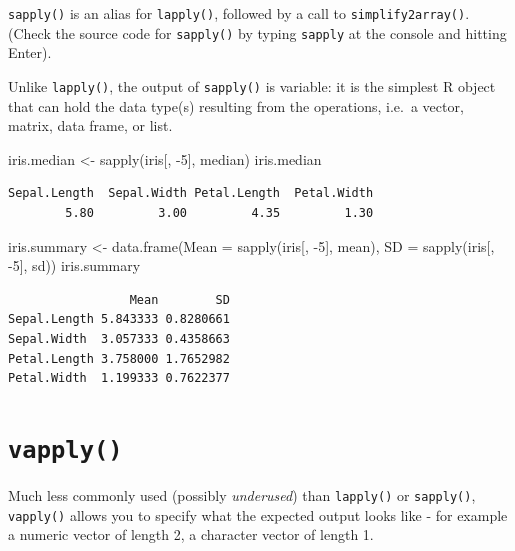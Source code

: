 \documentclass[
]{book}
\makeatletter
\newenvironment{Shaded}{\begin{snugshade}}{\end{snugshade}}
\newcommand{\AttributeTok}[1]{\textcolor[rgb]{0.77,0.63,0.00}{#1}}
\newcommand{\DecValTok}[1]{\textcolor[rgb]{0.00,0.00,0.81}{#1}}
\newcommand{\FunctionTok}[1]{\textcolor[rgb]{0.00,0.00,0.00}{#1}}
\newcommand{\NormalTok}[1]{#1}
\newcommand{\OtherTok}[1]{\textcolor[rgb]{0.56,0.35,0.01}{#1}}
\newcommand{\SpecialCharTok}[1]{\textcolor[rgb]{0.00,0.00,0.00}{#1}}
\newenvironment{kframe}{%
\medskip{}
\setlength{\fboxsep}{.8em}
 \def\at@end@of@kframe{}%
 \ifinner\ifhmode%
  \def\at@end@of@kframe{\end{minipage}}%
  \begin{minipage}{\columnwidth}%
 \fi\fi%
 \def\FrameCommand##1{\hskip\@totalleftmargin \hskip-\fboxsep
 \colorbox{shadecolor}{##1}\hskip-\fboxsep
     \hskip-\linewidth \hskip-\@totalleftmargin \hskip\columnwidth}%
 \MakeFramed {\advance\hsize-\width
   \@totalleftmargin\z@ \linewidth\hsize
   \@setminipage}}%
 {\par\unskip\endMakeFramed%
 \at@end@of@kframe}
\newenvironment{rmdblock}[1]
  {
  \begin{itemize}
  \renewcommand{\labelitemi}{
    \raisebox{-.7\height}[0pt][0pt]{
      {\setkeys{Gin}{width=3em,keepaspectratio}\texttt{[image: images/\#1]}}
    }
  }
  \setlength{\fboxsep}{1em}
  \begin{kframe}
  \item
  }
  {
  \end{kframe}
  \end{itemize}
  }
\newenvironment{note}
  {\begin{rmdblock}{note}}
  {\end{rmdblock}}
\makeatother
\begin{document}
\texttt{sapply()} is an alias for \texttt{lapply()}, followed by a call to \texttt{simplify2array()}.\\
(Check the source code for \texttt{sapply()} by typing \texttt{sapply} at the console and hitting Enter).

\begin{note}
Unlike \texttt{lapply()}, the output of \texttt{sapply()} is variable:
it is the simplest R object that can hold the data type(s) resulting
from the operations, i.e.~a vector, matrix, data frame, or list.
\end{note}

\begin{Shaded}
\begin{Highlighting}[]
\NormalTok{iris.median }\OtherTok{\textless{}{-}} \FunctionTok{sapply}\NormalTok{(iris[, }\SpecialCharTok{{-}}\DecValTok{5}\NormalTok{], median)}
\NormalTok{iris.median}
\end{Highlighting}
\end{Shaded}

\begin{verbatim}
Sepal.Length  Sepal.Width Petal.Length  Petal.Width 
        5.80         3.00         4.35         1.30 
\end{verbatim}

\begin{Shaded}
\begin{Highlighting}[]
\NormalTok{iris.summary }\OtherTok{\textless{}{-}} \FunctionTok{data.frame}\NormalTok{(}\AttributeTok{Mean =} \FunctionTok{sapply}\NormalTok{(iris[, }\SpecialCharTok{{-}}\DecValTok{5}\NormalTok{], mean),}
                           \AttributeTok{SD =} \FunctionTok{sapply}\NormalTok{(iris[, }\SpecialCharTok{{-}}\DecValTok{5}\NormalTok{], sd))}
\NormalTok{iris.summary}
\end{Highlighting}
\end{Shaded}

\begin{verbatim}
                 Mean        SD
Sepal.Length 5.843333 0.8280661
Sepal.Width  3.057333 0.4358663
Petal.Length 3.758000 1.7652982
Petal.Width  1.199333 0.7622377
\end{verbatim}

\hypertarget{vapply}{%
\section{\texorpdfstring{\texttt{vapply()}}{vapply()}}\label{vapply}}

Much less commonly used (possibly \emph{underused}) than \texttt{lapply()} or \texttt{sapply()}, \texttt{vapply()} allows you to specify what the expected output looks like - for example a numeric vector of length 2, a character vector of length 1.
\end{document}
